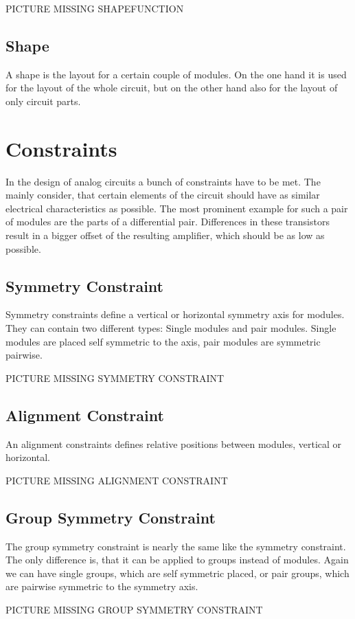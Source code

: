 PICTURE MISSING SHAPEFUNCTION

\subsection{Shape}
A shape is the layout for a certain couple of modules. On the one hand it is used for the layout of the whole circuit, but on the other hand also for the layout of only circuit parts.

\section{Constraints}
In the design of analog circuits a bunch of constraints have to be met. The mainly consider, that certain elements of the circuit should have as similar electrical characteristics as possible. The most prominent example for such a pair of modules are the parts of a differential pair. Differences in these transistors result in a bigger offset of the resulting amplifier, which should be as low as possible.
\subsection{Symmetry Constraint}
Symmetry constraints define a vertical or horizontal symmetry axis for modules. They can contain two different types: Single modules and pair modules. Single modules are placed self symmetric to the axis, pair modules are symmetric pairwise.

PICTURE MISSING SYMMETRY CONSTRAINT

\subsection{Alignment Constraint}
An alignment constraints defines relative positions between modules, vertical or horizontal.

PICTURE MISSING ALIGNMENT CONSTRAINT

\subsection{Group Symmetry Constraint}
The group symmetry constraint is nearly the same like the symmetry constraint. The only difference is, that it can be applied to groups instead of modules. Again we can have single groups, which are self symmetric placed, or pair groups, which are pairwise symmetric to the symmetry axis.

PICTURE MISSING GROUP SYMMETRY CONSTRAINT

